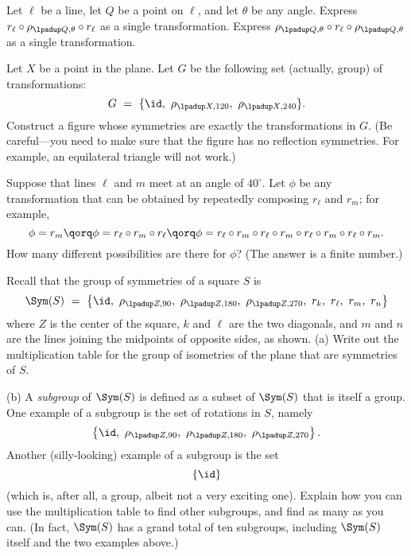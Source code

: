 \bigskip

\begin{TG}
Let $\ell$ be a line, let $Q$ be a point on $\ell$, and let
$\theta$ be any angle.
Express $r_\ell\circ\rho_{\lpadup Q,\theta}\circ r_\ell$ as a single transformation.
Express $\rho_{\lpadup Q,\theta}\circ r_\ell\circ\rho_{\lpadup Q,\theta}$ as a single transformation.
\end{TG}

\bigskip

\begin{TG}
Let $X$ be a point in the plane.  Let $G$ be the following set (actually,
group) of transformations:
  $$G ~=~ \{\id,\ \rho_{\lpadup X,120},\ \rho_{\lpadup X,240}\}.$$
Construct a figure whose symmetries are exactly the
transformations in $G$.  (Be careful---you need to make sure
that the figure has no reflection symmetries.  For example,
an equilateral triangle will not work.)
\end{TG}

\bigskip

\begin{TG}
Suppose that lines $\ell$ and $m$ meet at an angle of $40^\circ$.
Let $\phi$ be any transformation that can be obtained by repeatedly
composing $r_\ell$ and $r_m$; for example,
  $$\phi=r_m \qorq \phi=r_\ell\circ r_m\circ r_\ell \qorq \phi=r_\ell\circ r_m\circ r_\ell\circ r_m\circ r_\ell\circ r_m\circ r_\ell\circ r_m.$$
How many different possibilities are there for $\phi$?  (The answer
is a finite number.)
\end{TG}

\bigskip

\begin{TG}
Recall that the group of symmetries of a square $S$ is
  $$\Sym(S) ~=~ \left\{\id,\ \rho_{\lpadup Z,90},\ \rho_{\lpadup Z,180},\ 
    \rho_{\lpadup Z,270},\ r_k,\ r_\ell,\ r_m,\ r_n\right\}$$
where $Z$ is the center of the square, $k$ and $\ell$
are the two diagonals, and $m$ and $n$ are the lines joining
the midpoints of opposite sides, as shown.
(a) Write out the multiplication table for the group of 
isometries of the plane that are symmetries of $S$.

(b) A \emph{subgroup} of $\Sym(S)$ is defined as a subset of $\Sym(S)$
that is itself a group.  One example of a subgroup
is the set of rotations in $S$, namely
  $$\left\{\id,\ \rho_{\lpadup Z,90},\ \rho_{\lpadup Z,180},\ \rho_{\lpadup Z,270}\right\}.$$
Another (silly-looking) example of a subgroup is the set
  $$\{\id\}$$
(which is, after all, a group, albeit not a very exciting one).
Explain how you can use the multiplication table to find other subgroups,
and find as many as you can.  (In fact, $\Sym(S)$ has a grand total of
ten subgroups, including $\Sym(S)$ itself and the two examples above.)

\end{TG}

